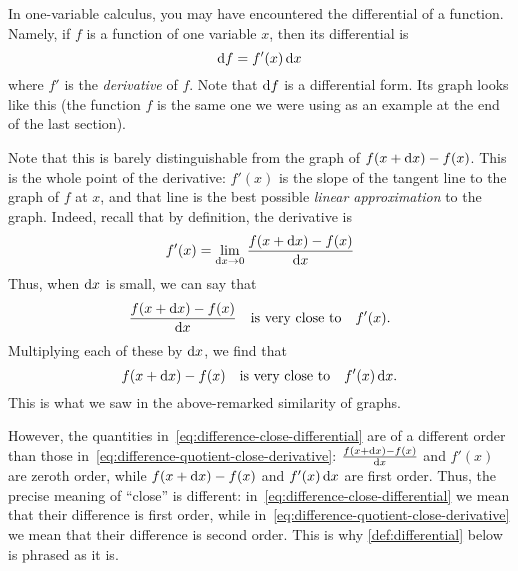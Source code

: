 \documentclass[12pt]{amsart}
\begin{document}
In one-variable calculus, you may have encountered the differential of a function.
Namely, if $f$ is a function of one variable $x$, then its differential is
\begin{equation}
  \mathrm{d} f = f'(x) \, \mathrm{d} x\label{eq:onevariable-differential}
\end{equation}
where $f'$ is the \emph{derivative} of $f$.
Note that $\mathrm{d} f$ is a differential form.
Its graph looks like this (the function $f$ is the same one we were using as an example at the end of the last section).
\begin{center}
\end{center}
Note that this is barely distinguishable from the graph of $f(x+\mathrm{d} x)-f(x)$.
This is the whole point of the derivative: $f'(x)$ is the slope of the tangent line to the graph of $f$ at $x$, and that line is the best possible \emph{linear approximation} to the graph.
Indeed, recall that by definition, the derivative is
\[ f'(x) = \lim_{\mathrm{d} x\to 0} \frac{f(x+\mathrm{d} x)-f(x)}{\mathrm{d} x} \]
Thus, when $\mathrm{d} x$ is small, we can say that
\begin{equation}\label{eq:difference-quotient-close-derivative}
  \frac{f(x+\mathrm{d} x)-f(x)}{\mathrm{d} x}\quad\text{is very close to}\quad f'(x).
\end{equation}
Multiplying each of these by $\mathrm{d} x$, we find that
\begin{equation}
  f(x+\mathrm{d} x)-f(x) \quad\text{is very close to}\quad f'(x)\,\mathrm{d} x.\label{eq:difference-close-differential}
\end{equation}
This is what we saw in the above-remarked similarity of graphs.

\begin{adv}
  However, the quantities in~\cref{eq:difference-close-differential} are of a different order than those in~\cref{eq:difference-quotient-close-derivative}:
  $\frac{f(x+\mathrm{d} x)-f(x)}{\mathrm{d} x}$ and $f'(x)$ are zeroth order, while $f(x+\mathrm{d} x)-f(x)$ and $f'(x)\,\mathrm{d} x$ are first order.
  Thus, the precise meaning of ``close'' is different: in~\cref{eq:difference-close-differential} we mean that their difference is first order, while in~\cref{eq:difference-quotient-close-derivative} we mean that their difference is second order.
  This is why \cref{def:differential} below is phrased as it is.
\end{adv}
\end{document}
